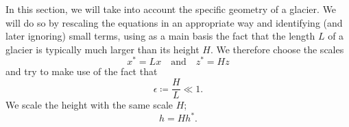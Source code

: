 In this section, we will take into account the specific geometry of a glacier.  We will do so by rescaling the equations in an appropriate way and identifying (and later ignoring) small terms, using as a main basis the fact that the length $L$ of a glacier is typically much larger than its height $H$. We therefore choose the scales
%
\begin{equation*}
    x^* = Lx \quad \text{and} \quad z^*=Hz
\end{equation*}
%
and try to make use of the fact that
%
\begin{equation*}
    \epsilon \coloneqq \frac{H}{L} \ll 1.
\end{equation*}
%
We scale the height with the same scale $H$;
%
\begin{equation*}
    h = Hh^*.
\end{equation*}
